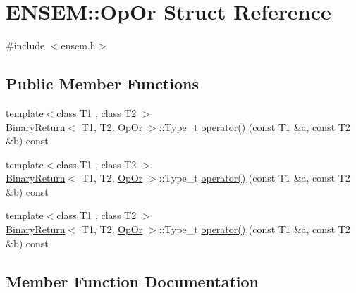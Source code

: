 \hypertarget{structENSEM_1_1OpOr}{}\section{E\+N\+S\+EM\+:\+:Op\+Or Struct Reference}
\label{structENSEM_1_1OpOr}


{\ttfamily \#include $<$ensem.\+h$>$}

\subsection*{Public Member Functions}
\begin{DoxyCompactItemize}
\item 
{\footnotesize template$<$class T1 , class T2 $>$ }\\\mbox{\hyperlink{structENSEM_1_1BinaryReturn}{Binary\+Return}}$<$ T1, T2, \mbox{\hyperlink{structENSEM_1_1OpOr}{Op\+Or}} $>$\+::Type\+\_\+t \mbox{\hyperlink{structENSEM_1_1OpOr_a8b897dcdf1e2210e064a33b281a22fc4}{operator()}} (const T1 \&a, const T2 \&b) const
\item 
{\footnotesize template$<$class T1 , class T2 $>$ }\\\mbox{\hyperlink{structENSEM_1_1BinaryReturn}{Binary\+Return}}$<$ T1, T2, \mbox{\hyperlink{structENSEM_1_1OpOr}{Op\+Or}} $>$\+::Type\+\_\+t \mbox{\hyperlink{structENSEM_1_1OpOr_a8b897dcdf1e2210e064a33b281a22fc4}{operator()}} (const T1 \&a, const T2 \&b) const
\item 
{\footnotesize template$<$class T1 , class T2 $>$ }\\\mbox{\hyperlink{structENSEM_1_1BinaryReturn}{Binary\+Return}}$<$ T1, T2, \mbox{\hyperlink{structENSEM_1_1OpOr}{Op\+Or}} $>$\+::Type\+\_\+t \mbox{\hyperlink{structENSEM_1_1OpOr_a8b897dcdf1e2210e064a33b281a22fc4}{operator()}} (const T1 \&a, const T2 \&b) const
\end{DoxyCompactItemize}


\subsection{Member Function Documentation}
\mbox{\label{structENSEM_1_1OpOr_a8b897dcdf1e2210e064a33b281a22fc4}} 
